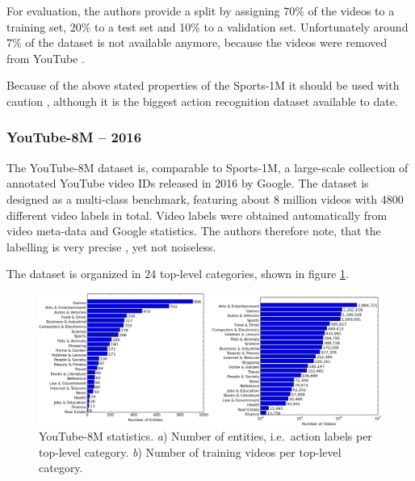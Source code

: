 For evaluation, the authors provide a split by assigning 70\% of the videos to a training set, 20\% to a test set and 10\% to a validation set.
Unfortunately around 7\% of the dataset is not available anymore, because the videos were removed from YouTube \cite{ng_beyond_2015}.

Because of the above stated properties of the Sports-1M it should be used with caution \cite{kang_review_2016}, although it is the biggest action recognition dataset available to date.

%

\subsubsection{YouTube-8M -- 2016}
The YouTube-8M dataset \cite{abu-el-haija_youtube-8m:_2016} is, comparable to Sports-1M, a large-scale collection of annotated YouTube video IDs released in 2016 by Google.
The dataset is designed as a multi-class benchmark, featuring about 8 million videos with 4800 different video labels in total.
Video labels were obtained automatically from video meta-data and Google statistics.
The authors therefore note, that the labelling is very precise \cite{abu-el-haija_youtube-8m:_2016}, yet not noiseless.

The dataset is organized in 24 top-level categories, shown in figure \ref{fig:youtube8m_toplevel}.

\begin{figure}[H]
    \centering
    \includegraphics[width=\textwidth]{img_datasets/youtube8m_toplevel}
\caption{YouTube-8M statistics. \textit{a}) Number of entities, i.e.\ action labels per top-level category. \textit{b}) Number of training videos per top-level category. \cite{abu-el-haija_youtube-8m:_2016}}
    \label{fig:youtube8m_toplevel}
\end{figure}

